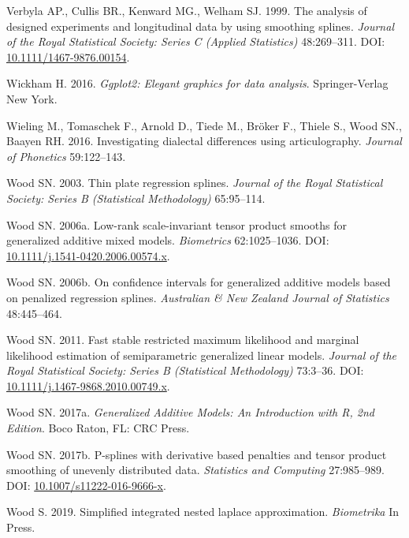 \documentclass[12pt]{article}
\begin{document}
\hypertarget{ref-verbyla_analysis_2002}{}
Verbyla AP., Cullis BR., Kenward MG., Welham SJ. 1999. The analysis of
designed experiments and longitudinal data by using smoothing splines.
\emph{Journal of the Royal Statistical Society: Series C (Applied
Statistics)} 48:269--311. DOI:
\href{https://doi.org/10.1111/1467-9876.00154}{10.1111/1467-9876.00154}.

\hypertarget{ref-wickham_ggplot2_2016}{}
Wickham H. 2016. \emph{Ggplot2: Elegant graphics for data analysis}.
Springer-Verlag New York.

\hypertarget{ref-wieling_investigating_2016}{}
Wieling M., Tomaschek F., Arnold D., Tiede M., Bröker F., Thiele S.,
Wood SN., Baayen RH. 2016. Investigating dialectal differences using
articulography. \emph{Journal of Phonetics} 59:122--143.

\hypertarget{ref-wood_thin_2003}{}
Wood SN. 2003. Thin plate regression splines. \emph{Journal of the Royal
Statistical Society: Series B (Statistical Methodology)} 65:95--114.

\hypertarget{ref-wood_lowrank_2006}{}
Wood SN. 2006a. Low-rank scale-invariant tensor product smooths for
generalized additive mixed models. \emph{Biometrics} 62:1025--1036. DOI:
\href{https://doi.org/10.1111/j.1541-0420.2006.00574.x}{10.1111/j.1541-0420.2006.00574.x}.

\hypertarget{ref-wood_confidence_2006}{}
Wood SN. 2006b. On confidence intervals for generalized additive models
based on penalized regression splines. \emph{Australian \& New Zealand
Journal of Statistics} 48:445--464.

\hypertarget{ref-wood_fast_2011}{}
Wood SN. 2011. Fast stable restricted maximum likelihood and marginal
likelihood estimation of semiparametric generalized linear models.
\emph{Journal of the Royal Statistical Society: Series B (Statistical
Methodology)} 73:3--36. DOI:
\href{https://doi.org/10.1111/j.1467-9868.2010.00749.x}{10.1111/j.1467-9868.2010.00749.x}.

\hypertarget{ref-wood_generalized_2017}{}
Wood SN. 2017a. \emph{Generalized Additive Models: An Introduction with
R, 2nd Edition}. Boco Raton, FL: CRC Press.

\hypertarget{ref-wood_p_splines_2017}{}
Wood SN. 2017b. P-splines with derivative based penalties and tensor
product smoothing of unevenly distributed data. \emph{Statistics and
Computing} 27:985--989. DOI:
\href{https://doi.org/10.1007/s11222-016-9666-x}{10.1007/s11222-016-9666-x}.

\hypertarget{ref-wood_simplified_2019}{}
Wood S. 2019. Simplified integrated nested laplace approximation.
\emph{Biometrika} In Press.
\end{document}
